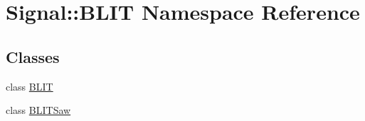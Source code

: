 \hypertarget{namespace_signal_1_1_b_l_i_t}{\section{Signal\+:\+:B\+L\+I\+T Namespace Reference}
\label{namespace_signal_1_1_b_l_i_t}
}
\subsection*{Classes}
\begin{DoxyCompactItemize}
\item 
class \hyperlink{class_signal_1_1_b_l_i_t_1_1_b_l_i_t}{B\+L\+I\+T}
\item 
class \hyperlink{class_signal_1_1_b_l_i_t_1_1_b_l_i_t_saw}{B\+L\+I\+T\+Saw}
\end{DoxyCompactItemize}
